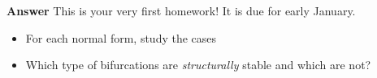 \documentclass[usenames,dvipsnames,svgnames,10pt,aspectratio=169]{beamer}
\begin{document}
\begin{frame}[t, c]{}{}

	\begin{block}{\centering \textbf{Answer}}
		\centering
		This is your very first homework! It is due for early January.
	\end{block}

	\bigskip

	\begin{itemize}
		\item For each normal form, study the cases
			\begin{multicols}{3}
				\centering
				\item[$\hookrightarrow$] $\epsilon < 0$,
				\item[$\hookrightarrow$] $\epsilon = 0$,
				\item[$\hookrightarrow$] $\epsilon > 0$.
			\end{multicols}

		\item Which type of bifurcations are \emph{structurally} stable and which are not?
	\end{itemize}

	\vspace{-1cm}
\end{frame}
\end{document}
